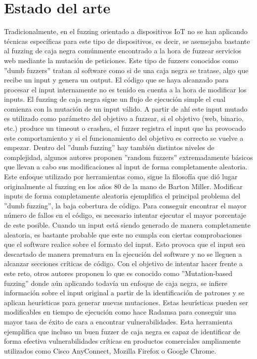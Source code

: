 \chapter{Estado del arte}
\label{estado_del_arte}
Tradicionalmente, en el fuzzing orientado a dispositivos IoT no se han aplicando técnicas
específicas para este tipo de dispositivos, es decir, se asemejaba bastante al fuzzing de caja negra 
comúnmente encontrado a la hora de fuzzear servicios web mediante la mutación de peticiones.
Este tipo de fuzzers conocidos como ''dumb fuzzers'' tratan al software como si de una caja negra se tratase, 
algo que recibe un input y genera un output. El código que se haya alcanzado para procesar el input internamente no es tenido en
cuenta a la hora de modificar los inputs. El fuzzing de caja negra sigue un flujo de ejecución simple el 
cual comienza con la mutación de un input válido.
A partir de ahí este input mutado es utilizado como parámetro del objetivo a fuzzear, si el 
objetivo (web, binario, etc.) produce un timeout o crashea, el fuzzer registra el input que 
ha provocado este comportamiento y si el funcionamiento del objetivo es correcto se vuelve a empezar. Dentro del ''dumb fuzzing'' hay también
distintos niveles de complejidad, algunos autores proponen ''random fuzzers'' extremadamente básicos que 
llevan a cabo sus modificaciones al input de forma completamente aleatoria. Este enfoque utilizado por 
herramientas como\cite{zzuf}, sigue la filosofía que dió lugar originalmente al fuzzing en 
los años 80 de la mano de Barton Miller\cite{Miller1990}. Modificar inputs de forma completamente aleatoria
ejemplifica el principal problema del ''dumb fuzzing'', la baja cobertura de código. Para conseguir encontrar 
el mayor número de fallos en el código, es necesario intentar ejecutar el mayor porcentaje de este posible. Cuando 
un input está siendo generado de manera completamente aleatoria, es bastante probable que este no cumpla con
ciertas comprobaciones que el software realice sobre el formato del input. Esto provoca que el input sea descartado 
de manera prematura en la ejecución del software y no se lleguen a alcanzar secciones críticas de código.
Con el objetivo de intentar hacer frente a este reto, otros autores proponen lo que es 
conocido como ''Mutation-based fuzzing'' donde aún aplicando todavía un enfoque de caja negra, se infiere
información sobre el input original a partir de la identificación de patrones y se aplican heurísticas para generar
nuevas mutaciones. Estas heurísticas pueden ser modificables en tiempo de ejecución como hace Radamsa\cite{radamsa}
para conseguir una mayor tasa de éxito de cara a encontrar vulnerabilidades. Esta herramienta ejemplifica que incluso 
un buen fuzzer de caja negra es capaz de identificar de forma efectiva vulnerabilidades críticas en productos comerciales 
ampliamente utilizados como Cisco AnyConnect, Mozilla Firefox o Google Chrome.

